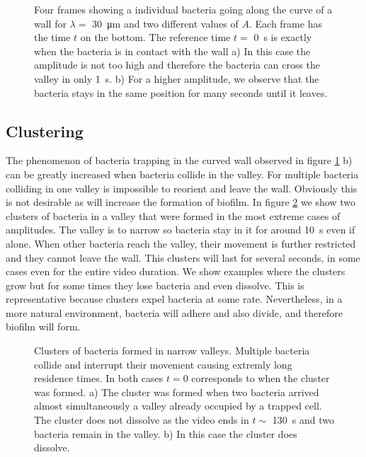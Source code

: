 \begin{figure}
	\centering
	
	\caption[Trajectories of bacteria following the profile of the curved wall]{Four frames showing a individual bacteria going along the curve of a wall for $\lambda=$ \SI{30}{\micro\meter} and two different values of $A$. Each frame has the time $t$ on the bottom. The reference time $t=$ \SI{0}{\second} is exactly when the bacteria is in contact with the wall a) In this case the amplitude is not too high and therefore the bacteria can cross the valley in only \SI{1}{\second}. b) For a higher amplitude, we observe that the bacteria stays in the same position for many seconds until it leaves.  }
	\label{esteric allignmente experiments}
\end{figure}
 
\label{section: clustering} 
\subsection{Clustering}

The phenomenon of bacteria trapping in the curved wall observed in figure \ref{esteric allignmente experiments} b) can be greatly increased when bacteria collide in the valley. For multiple bacteria colliding in one valley is impossible to reorient and leave the wall. Obviously this is not desirable as will increase the formation of biofilm. In figure \ref{clustering} we show two clusters of bacteria in a valley that were formed in the most extreme cases of amplitudes. The valley is to narrow so bacteria stay in it for around \SI{10}{\second} even if alone. When other bacteria reach the valley, their movement is further restricted and they cannot leave the wall. This clusters will last for several seconds, in some cases even for the entire video duration. We show examples where the clusters grow but for some times they lose bacteria and even dissolve. This is representative because clusters expel bacteria at some rate. Nevertheless, in a more natural environment, bacteria will adhere and also divide, and therefore biofilm will form. 

\begin{figure}
	\centering
	
	\caption[Clusters formed in valleys of the most ]{Clusters of bacteria formed in narrow valleys. Multiple bacteria collide and interrupt their movement causing extremly long residence times. In both cases $t=0$ corresponds to when the cluster was formed. a) The cluster was formed when two bacteria arrived almost simultaneously a valley already occupied by a trapped cell. The cluster does not dissolve as the video ends in $t\sim$ \SI{130}{\second} and two bacteria remain in the valley. b) In this case the cluster does dissolve. }
	\label{clustering}
\end{figure}
 
